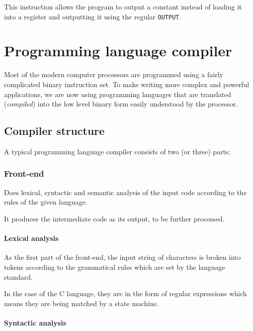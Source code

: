         This instruction allows the program to output a constant instead of loading it into a register and outputting it using the regular \texttt{OUTPUT}.



\chapter{Programming language compiler}

Most of the modern computer processors are programmed using a fairly complicated binary instruction set. To make writing more complex and powerful applications, we are now using programming languages that are translated (\emph{compiled}) into the low level binary form easily understood by the processor.

    \section{Compiler structure}

    A typical programming language compiler consists of two (or three) parts:

        \subsection{Front-end}

            Does lexical, syntactic and semantic analysis of the input code according to the rules of the given language.

            It produces the intermediate code as its output, to be further processed.

            \subsubsection{Lexical analysis}

                As the first part of the front-end, the input string of characters is broken into tokens according to the grammatical rules which are set by the language standard.

                In the case of the C language, they are in the form of regular expressions which means they are being matched by a state machine.

            \subsubsection{Syntactic analysis}


